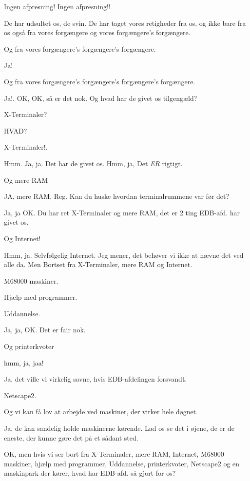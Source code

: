 \documentclass[10pt]{article}
\begin{document}
\begin{sketch}
 Ingen afpresning! Ingen afpresning!!

 De har udsultet os, de svin. De har taget vores retigheder fra os, og 
ikke bare fra os også fra vores forgængere og vores forgængere's forgængere.

 Og fra vores forgængere's forgængere's forgængere.

 Ja!

 Og fra vores forgængere's forgængere's forgængere's forgængere.

 Ja!. OK, OK, så er det nok. Og hvad har de givet os tilgengæld?

 X-Terminaler? 

 HVAD?

 X-Terminaler!.

 Hmm.  Ja, ja. Det har de givet os. Hmm, ja, Det {\em ER} rigtigt.

 Og mere RAM

 JA, mere RAM, Reg. Kan du huske hvordan terminalrummene var før det?

 Ja, ja OK.  Du har ret X-Terminaler og mere RAM, det er 2 ting EDB-afd. har 
givet os.

 Og Internet!

 Hmm, ja. Selvfølgelig Internet. Jeg mener, det behøver vi ikke at nævne 
det ved alle da. Men Bortset fra X-Terminaler, mere RAM og Internet.

 M68000 maskiner.

 Hjælp med programmer.

 Uddannelse.

 Ja, ja, OK. Det er fair nok.

 Og printerkvoter

 hmm, ja, jaa!

 Ja, det ville vi virkelig savne, hvis EDB-afdelingen forsvandt.

 Netscape2.

 Og vi kan få lov at arbejde ved maskiner, der virker hele døgnet.

 Ja, de kan sandelig holde maskinerne kørende. Lad os se det i øjene, 
de er de eneste, der kunne gøre det på et sådant sted.

 OK, men hvis vi ser bort fra X-Terminaler, mere RAM, Internet, M68000 
maskiner,  hjælp med programmer, Uddannelse, printerkvoter, Netscape2 og en 
maskinpark der kører, hvad har EDB-afd. så gjort for os?


\end{sketch}
\end{document}

